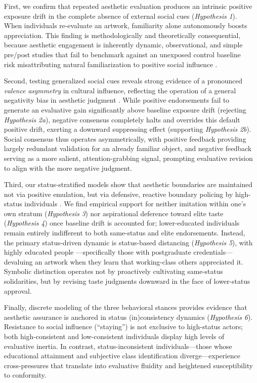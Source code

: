 \documentclass[12pt, letterpaper]{article}
\begin{document}
First, we confirm that repeated aesthetic evaluation produces an intrinsic positive exposure drift in the complete absence of external social cues (\textit{Hypothesis 1}). When individuals re-evaluate an artwork, familiarity alone autonomously boosts appreciation. This finding is methodologically and theoretically consequential, because aesthetic engagement is inherently dynamic, observational, and simple pre/post studies that fail to benchmark against an unexposed control baseline risk misattributing natural familiarization to positive social influence \citep{cutting2003gustave}.

Second, testing generalized social cues reveals strong evidence of a pronounced \textit{valence asymmetry} in cultural influence, reflecting the operation of a general negativity bias in aesthetic judgment \citep{rozin2001negativity-01e, baumeister2001bad-19b}. While positive endorsements fail to generate an evaluative gain significantly above baseline exposure drift (rejecting \textit{Hypothesis 2a}), negative consensus completely halts and overrides this default positive drift, exerting a downward suppressing effect (supporting \textit{Hypothesis 2b}). Social consensus thus operates asymmetrically, with positive feedback providing largely redundant validation for an already familiar object, and negative feedback serving as a more salient, attention-grabbing signal, prompting evaluative revision to align with the more negative judgment.

Third, our status-stratified models show that aesthetic boundaries are maintained not via positive emulation, but via defensive, reactive boundary policing by high-status individuals \citep{goldberg2016what-4e3}. We find empirical support for neither imitation within one's own stratum (\textit{Hypothesis 3}) nor aspirational deference toward elite taste (\textit{Hypothesis 4}) once baseline drift is accounted for; lower-educated individuals remain entirely indifferent to both same-status and elite endorsements. Instead, the primary status-driven dynamic is status-based distancing (\textit{Hypothesis 5}), with highly educated people ---specifically those with postgraduate credentials---devaluing an artwork when they learn that working-class others appreciated it. Symbolic distinction operates not by proactively cultivating same-status solidarities, but by revising taste judgments downward in the face of lower-status approval.

Finally, discrete modeling of the three behavioral stances provides evidence that aesthetic assurance is anchored in status (in)consistency dynamics (\textit{Hypothesis 6}). Resistance to social influence (``staying'') is not exclusive to high-status actors; both high-consistent and low-consistent individuals display high levels of evaluative inertia. In contrast, status-inconsistent individuals---those whose educational attainment and subjective class identification diverge---experience cross-pressures \citep{davis1963structural-90b} that translate into evaluative fluidity and heightened susceptibility to conformity.
\end{document}
